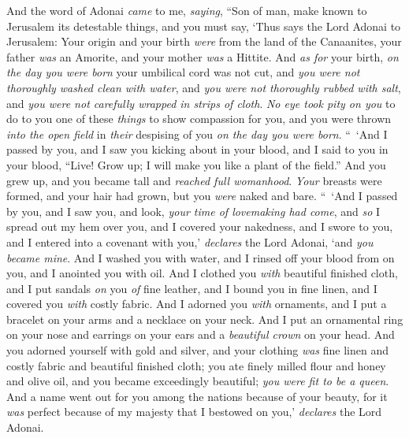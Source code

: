 \begin{biblechapter} %
 And the word of Adonai \textit{came} to me, \textit{saying},
\verse “Son of man, make known to Jerusalem its detestable things,
\verse and you must say, ‘Thus says the Lord Adonai to Jerusalem: Your origin and your birth \textit{were} from the land of the Canaanites, your father \textit{was} an Amorite, and your mother \textit{was} a Hittite.
\verse And \textit{as for} your birth, \textit{on the day you were born} your umbilical cord was not cut, and \textit{you were not thoroughly washed clean with water}, and \textit{you were not thoroughly rubbed with salt}, and \textit{you were not carefully wrapped in strips of cloth}.
\verse \textit{No eye took pity on you} to do to you one of these \textit{things} to show compassion for you, and you were thrown \textit{into the open field} in \textit{their} despising of you \textit{on the day you were born}.
\verse “ ‘And I passed by you, and I saw you kicking about in your blood, and I said to you in your blood, “Live!
\verse Grow up; I will make you like a plant of the field.” And you grew up, and you became tall and \textit{reached full womanhood}. \textit{Your} breasts were formed, and your hair had grown, but you \textit{were} naked and bare.
\verse “ ‘And I passed by you, and I saw you, and look, \textit{your time of lovemaking had come}, and \textit{so} I spread out my hem over you, and I covered your nakedness, and I swore to you, and I entered into a covenant with you,’ \textit{declares} the Lord Adonai, ‘and \textit{you became mine}.
\verse And I washed you with water, and I rinsed off your blood from on you, and I anointed you with oil.
\verse And I clothed you \textit{with} beautiful finished cloth, and I put sandals \textit{on} you \textit{of} fine leather, and I bound you in fine linen, and I covered you \textit{with} costly fabric.
\verse And I adorned you \textit{with} ornaments, and I put a bracelet on your arms and a necklace on your neck.
\verse And I put an ornamental ring on your nose and earrings on your ears and a \textit{beautiful crown} on your head.
\verse And you adorned yourself with gold and silver, and your clothing \textit{was} fine linen and costly fabric and beautiful finished cloth; you ate finely milled flour and honey and olive oil, and you became exceedingly beautiful; \textit{you were fit to be a queen}.
\verse And a name went out for you among the nations because of your beauty, for it \textit{was} perfect because of my majesty that I bestowed on you,’ \textit{declares} the Lord Adonai.

\end{biblechapter}
